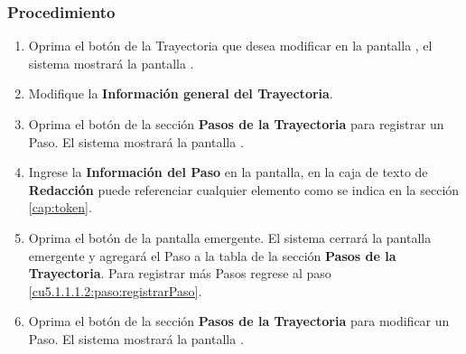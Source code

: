\subsubsection{Procedimiento}
\begin{enumerate}
	\item Oprima el botón \btnEditar de la Trayectoria que desea modificar en la pantalla , el sistema mostrará la pantalla . 

	
	\item Modifique la \textbf{Información general del Trayectoria}.
	
	\item Oprima el botón  de la sección \textbf{Pasos de la Trayectoria} para registrar un Paso. El sistema mostrará la pantalla . \label{cu5.1.1.1.2:paso:registrarPaso}

	
	\item Ingrese la \textbf{Información del Paso} en la pantalla, en la caja de texto de \textbf{Redacción} puede referenciar cualquier elemento como se indica en la sección \ref{cap:token}.
	
	\item Oprima el botón  de la pantalla emergente. El sistema cerrará la pantalla emergente y agregará el Paso a la tabla de la sección \textbf{Pasos de la Trayectoria}. Para registrar más Pasos regrese al paso \ref{cu5.1.1.1.2:paso:registrarPaso}.
	
	\item Oprima el botón \btnEditar de la sección \textbf{Pasos de la Trayectoria} para modificar un Paso. El sistema mostrará la pantalla . \label{cu5.1.1.1.2:paso:modificarPaso}


\end{enumerate}
